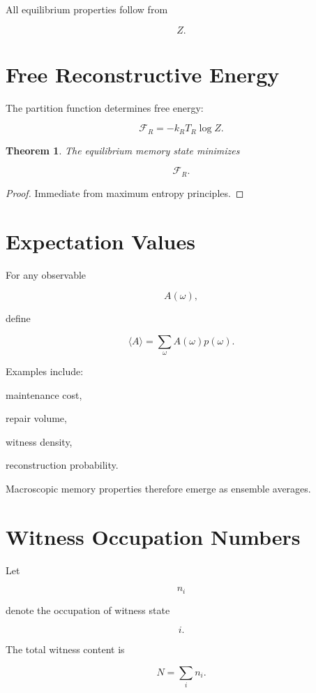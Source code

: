\documentclass[12pt,oneside]{book}
\theoremstyle{plain} \newtheorem{theorem}{Theorem}[chapter] \newtheorem{lemma}[theorem]{Lemma} \newtheorem{proposition}[theorem]{Proposition} \newtheorem{corollary}[theorem]{Corollary}
\theoremstyle{definition} \newtheorem{definition}[theorem]{Definition} \newtheorem{axiom}[theorem]{Axiom} \newtheorem{construction}[theorem]{Construction}
\theoremstyle{remark} \newtheorem{remark}[theorem]{Remark} \newtheorem{example}[theorem]{Example}
\begin{document}
All equilibrium properties follow from

\[
Z.
\]

\section{Free Reconstructive Energy}

The partition function determines free energy:

\[
\mathcal F_R
=
-k_RT_R
\log Z.
\]

\begin{theorem}

The equilibrium memory state minimizes

\[
\mathcal F_R.
\]

\end{theorem}

\begin{proof}

Immediate from maximum entropy principles.

\end{proof}

\section{Expectation Values}

For any observable

\[
A(\omega),
\]

define

\[
\langle A\rangle
=
\sum_\omega
A(\omega)
p(\omega).
\]

Examples include:

maintenance cost,

repair volume,

witness density,

reconstruction probability.

Macroscopic memory properties therefore emerge as ensemble averages.

\section{Witness Occupation Numbers}

Let

\[
n_i
\]

denote the occupation of witness state

\[
i.
\]

The total witness content is

\[
N
=
\sum_i n_i.
\]
\end{document}
